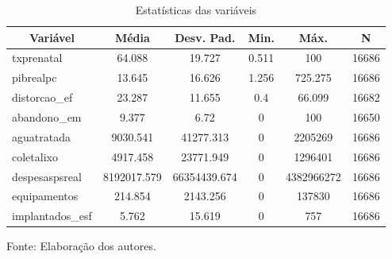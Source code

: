 \documentclass[twoside,onecolumn,12pt]{article}
\numberwithin{outputctr}{section}
\begin{document}
\begin{table}[htbp]\centering \caption{Estat\'{i}sticas das vari\'{a}veis \label{tabEstatisticas}}
\begin{tabular}{l c c c c c}\hline\hline
\multicolumn{1}{c}{\textbf{Vari\'{a}vel}} & \textbf{M\'{e}dia} & \textbf{Desv. Pad.}& \textbf{Min.} &  \textbf{M\'{a}x.} & \textbf{N} \\ \hline
txprenatal & 64.088 & 19.727 & 0.511 & 100 & 16686\\
pibrealpc & 13.645 & 16.626 & 1.256 & 725.275 & 16686\\
distorcao\_ef & 23.287 & 11.655 & 0.4 & 66.099 & 16682\\
abandono\_em & 9.377 & 6.72 & 0 & 100 & 16650\\
aguatratada & 9030.541 & 41277.313 & 0 & 2205269 & 16686\\
coletalixo & 4917.458 & 23771.949 & 0 & 1296401 & 16686\\
despesaspsreal & 8192017.579 & 66354439.674 & 0 & 4382966272 & 16686\\
equipamentos & 214.854 & 2143.256 & 0 & 137830 & 16686\\
implantados\_esf & 5.762 & 15.619 & 0 & 757 & 16686\\
\hline
\end{tabular}
\begin{tablenotes}
\item \tiny{Fonte: Elaboração dos autores.}
\end{tablenotes}
\end{table}
\end{document}

